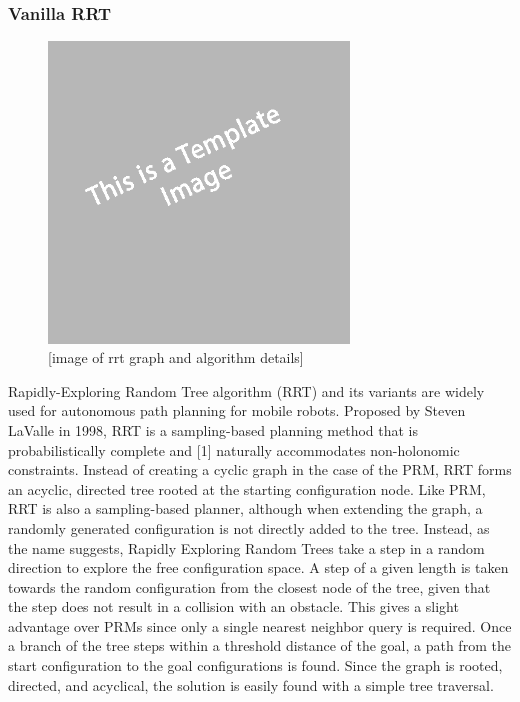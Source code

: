 \documentclass[12pt]{article}
\begin{document}
        \subsubsection{Vanilla RRT}
            \begin{figure}[ht]
                \includegraphics[width=8cm]{temp}
                \centering
                \caption{[image of rrt graph and algorithm details]}
            \end{figure}
            \par  Rapidly-Exploring Random Tree algorithm (RRT) and its variants are widely used for autonomous path planning for mobile robots. Proposed by Steven LaValle in 1998, RRT is a sampling-based planning method that is probabilistically complete and [1] naturally accommodates non-holonomic constraints. Instead of creating a cyclic graph in the case of the PRM, RRT forms an acyclic, directed tree rooted at the starting configuration node. Like PRM, RRT is also a sampling-based planner, although when extending the graph, a randomly generated configuration is not directly added to the tree. Instead, as the name suggests, Rapidly Exploring Random Trees take a step in a random direction to explore the free configuration space. A step of a given length is taken towards the random configuration from the closest node of the tree, given that the step does not result in a collision with an obstacle. This gives a slight advantage over PRMs since only a single nearest neighbor query is required. Once a branch of the tree steps within a threshold distance of the goal, a path from the start configuration to the goal configurations is found. Since the graph is rooted, directed, and acyclical, the solution is easily found with a simple tree traversal. 
\end{document}
